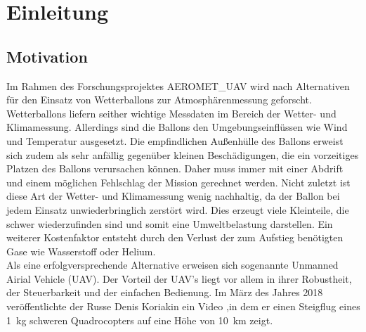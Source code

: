 \chapter{Einleitung}
\label{chap:Einleitung}

\section{Motivation}
\label{sec:motivation}
Im Rahmen des Forschungsprojektes AEROMET\_UAV wird nach Alternativen für den Einsatz von Wetterballons zur Atmosphärenmessung geforscht. Wetterballons liefern seither wichtige Messdaten im Bereich der Wetter- und Klimamessung. Allerdings sind die Ballons den Umgebungseinflüssen wie Wind und Temperatur ausgesetzt. Die empfindlichen Außenhülle des Ballons erweist sich zudem als sehr anfällig gegenüber kleinen Beschädigungen, die ein vorzeitiges Platzen des Ballons verursachen können. Daher muss immer mit einer Abdrift und einem möglichen Fehlschlag der Mission gerechnet werden. Nicht zuletzt ist diese Art der Wetter- und Klimamessung wenig nachhaltig, da der Ballon bei jedem Einsatz unwiederbringlich zerstört wird. Dies erzeugt viele Kleinteile, die schwer wiederzufinden sind und somit eine Umweltbelastung darstellen. Ein weiterer Kostenfaktor entsteht durch den Verlust der zum Aufstieg benötigten Gase wie Wasserstoff oder Helium.\\
Als eine erfolgversprechende Alternative erweisen sich sogenannte Unmanned Airial Vehicle (UAV). Der Vorteil der UAV's liegt vor allem in ihrer Robustheit, der Steuerbarkeit und der einfachen Bedienung. Im März des Jahres 2018 veröffentlichte der Russe Denis Koriakin ein Video \cite{Anderson.2018},in dem er einen Steigflug eines \SI{1}{kg} schweren Quadrocopters auf eine Höhe von \SI{10}{km} zeigt. 


